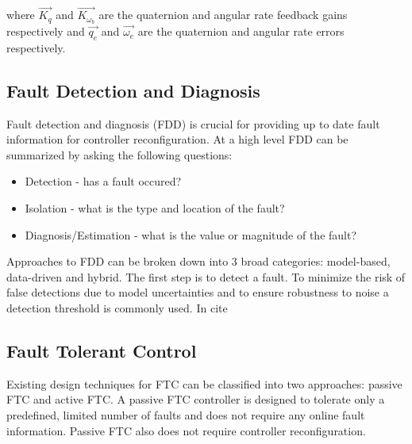 where $\vec{K_{q}}$ and $\vec{K_{\omega_{b}}}$ are the quaternion and angular rate feedback gains respectively and $\vec{q_{e}}$ and $\vec{\omega_{e}}$ 
are the quaternion and angular rate errors respectively.

\subsection{Fault Detection and Diagnosis}
Fault detection and diagnosis (FDD) is crucial for providing up to date fault information for controller reconfiguration. At a high level FDD can be summarized by asking the following questions:
\begin{itemize}
    \item Detection - has a fault occured?
    \item Isolation - what is the type and location of the fault?
    \item Diagnosis/Estimation - what is the value or magnitude of the fault?
\end{itemize}

Approaches to FDD can be broken down into 3 broad categories: model-based, data-driven and hybrid. 
The first step is to detect a fault. To minimize the risk of false detections due to model uncertainties and to ensure robustness to noise a detection threshold is commonly used. In cite{}


\subsection{Fault Tolerant Control}
Existing design techniques for FTC can be classified into two approaches: passive FTC and active FTC. A passive FTC controller is designed to tolerate only a predefined, limited number of faults and does not require any online fault information. Passive FTC also does not require controller reconfiguration. \cite{yinReviewRecentDevelopment2016}

